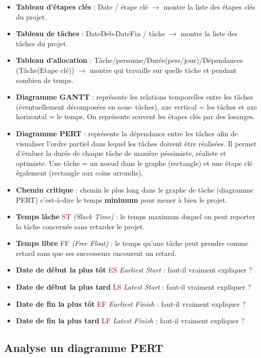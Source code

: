 \documentclass{article}
\newcommand{\rouge}[1]{\textcolor{darkred}{#1}}
\begin{document}
\begin{sffamily}
\begin{itemize}
\item \textbf{Tableau d'étapes clés} : Date / étape clé $\rightarrow$ montre la liste des étapes clés du projet.
\item \textbf{Tableau de tâches} : DateDeb-DateFin / tâche $\rightarrow$ montre la liste des tâches du projet.
\item \textbf{Tableau d'allocation} : Tâche/personne/Durée(pers/jour)/Dépendances (Tâche(Etape clé)) $\rightarrow$ montre qui 
travaille sur quelle tâche et pendant combien de temps.
\item \textbf{Diagramme GANTT} : représente les relations temporelles entre les tâches (éventuellement décomposées en sous-
tâches), axe vertical = les tâches et axe horizontal = le temps. On représente souvent les étapes clés par des losanges.
\item \textbf{Diagramme PERT} : représente la dépendance entre les tâches afin de visualiser l'ordre partiel dans lequel les 
tâches doivent être réalisées. Il permet d'évaluer la durée de chaque tâche de manière péssimiste, réaliste et optimiste. Une
tâche = un noeud dans le graphe (rectangle) et une étape clé également (rectangle aux coins arrondis).
\item \textbf{Chemin critique} : chemin le plus long dans le graphe de tâche (diagramme PERT) c'est-à-dire le temps 
\textbf{minimum} pour mener à bien le projet.
\item \textbf{Temps lâche} \rouge{ST} \textit{(Slack Time)} : le temps maximum duquel on peut reporter la tâche concernée sans 
retarder le projet.
\item \textbf{Temps libre} \rouge{FF} \textit{(Free Float)} : le temps qu'une tâche peut prendre comme retard sans que ses 
successeurs encourent un retard.
\item \textbf{Date de début la plus tôt} \rouge{ES} \textit{Earliest Start} : faut-il vraiment expliquer ?
\item \textbf{Date de début la plus tard} \rouge{LS} \textit{Latest Start} : faut-il vraiment expliquer ?
\item \textbf{Date de fin la plus tôt} \rouge{EF} \textit{Earliest Finish} : faut-il vraiment expliquer ?
\item \textbf{Date de fin la plus tard} \rouge{LF} \textit{Latest Finish} : faut-il vraiment expliquer ?
\end{itemize}

\subsection{Analyse un diagramme PERT}


\end{sffamily}
\end{document}
